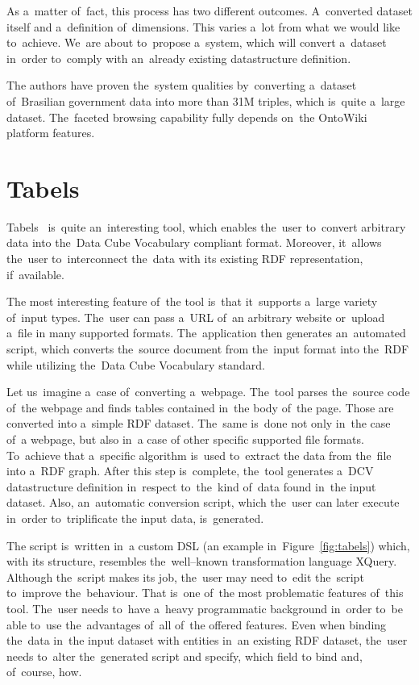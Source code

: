 As a~matter of~fact, this process has two different outcomes. A~converted 
dataset itself and a~definition of~dimensions. This varies a~lot from what 
we would like to~achieve. We~are about to~propose a~system, which will convert a~dataset in~order to~comply with an~already existing datastructure definition.

The authors have proven the~system qualities by~converting a~dataset of~Brasilian government data
into more than 31M triples, which is~quite a~large dataset. The~faceted browsing
capability fully depends on~the OntoWiki platform features.

\section{Tabels}
\label{rw:tabels}
Tabels~\cite{tabels-web} is~quite an~interesting tool, which enables the~user to~convert arbitrary data into the~Data Cube Vocabulary compliant format. 
Moreover, it~allows the~user to~interconnect the~data with its existing RDF 
representation, if~available.

The most interesting feature of~the tool is~that it~supports a~large variety of~input types. The~user can pass a~URL of~an arbitrary website or~upload a~file 
in many supported formats. The~application then generates an~automated script, which converts the~source document from the~input format 
into the~RDF while utilizing the~Data Cube Vocabulary standard.

Let us~imagine a~case of~converting a~webpage. The~tool parses the~source code of~the webpage and 
finds tables contained in~the body of~the page. Those are converted into a~simple
RDF dataset. The~same is~done not only in~the case of~a webpage, but also in~a case
of other specific supported file formats. To~achieve that a~specific algorithm is~used to~extract
the data from the~file into a~RDF graph. After this step is~complete, the~tool generates a~DCV
datastructure definition in~respect to~the~kind of~data found in~the input dataset.
Also, an~automatic conversion script, which the~user can later execute in~order to~triplificate
the input data, is~generated.

The script is~written in~a custom DSL (an example in~Figure~\ref{fig:tabels}) which,
with its structure, resembles the~well--known
transformation language XQuery. Although the~script makes its job, the~user may need to~edit the~script to~improve the~behaviour. That is~one of~the 
most problematic features of~this tool. The~user needs to~have a~heavy programmatic 
background in~order to~be able to~use the~advantages of~all of~the offered features. 
Even when binding the~data in~the input dataset with entities in~an existing RDF 
dataset, the~user needs to~alter the~generated script and specify, which field 
to bind and, of~course, how.

